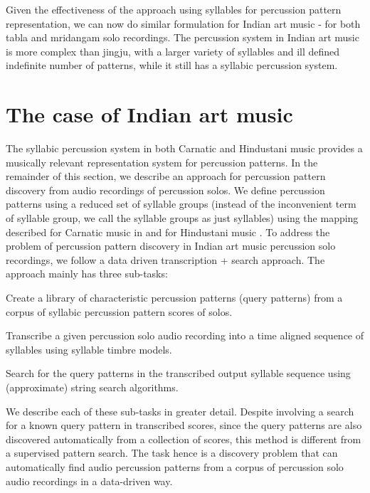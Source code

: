 Given the effectiveness of the approach using syllables for percussion pattern representation, we can now do similar formulation for Indian art music - for both \gls{tabla} and mridangam solo recordings. The percussion system in Indian art music is more complex than \gls{jingju}, with a larger variety of syllables and ill defined indefinite number of patterns, while it still has a syllabic percussion system. 
% 
\section{The case of Indian art music}
The syllabic percussion system in both Carnatic and Hindustani music provides a musically relevant representation system for percussion patterns. In the remainder of this section, we describe an approach for percussion pattern discovery from audio recordings of percussion solos. We define percussion patterns using a reduced set of syllable groups (instead of the inconvenient term of syllable group, we call the syllable groups as just syllables) using the mapping described for Carnatic music in  and for Hindustani music . To address the problem of percussion pattern discovery in Indian art music percussion solo recordings, we follow a data driven transcription + search approach. The approach mainly has three sub-tasks: 
\begin{description}[leftmargin=*,itemsep=3pt]
	\item[Pattern library generation:]Create a library of characteristic percussion patterns (query patterns) from a corpus of syllabic percussion pattern scores of solos. 
	\item[Automatic transcription:]Transcribe a given percussion solo audio recording into a time aligned sequence of syllables using syllable timbre models. 
	\item[Approximate pattern search:]Search for the query patterns in the transcribed output syllable sequence using (approximate) string search algorithms. 
\end{description}
We describe each of these sub-tasks in greater detail. Despite involving a search for a known query pattern in transcribed scores, since the query patterns are also discovered automatically from a collection of scores, this method is different from a supervised pattern search. The task hence is a discovery problem that can automatically find audio percussion patterns from a corpus of percussion solo audio recordings in a data-driven way. 


